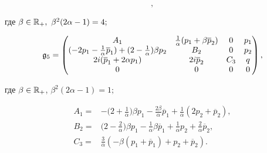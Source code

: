 \begin{thm}
\begin{equation}
,


\end{equation}


где $ \beta \in \Bbb R_+, \ \beta^2 (2 \alpha - 1 ) = 4;$


\begin{equation}


\frak g_5 =


\begin{pmatrix}


A_1 & \frac1{\alpha} ( p_1 + \beta \overline p_2 ) & 0 & p_1 


\\


( - 2 p_1 - \frac1{\alpha} \overline p_1 ) + ( 2 - \frac1{\alpha} ) \beta p_2 


& B_2 & 0 & p_2\\ 


2i (\overline p_1 + 2 \alpha p_1) & 2 i \overline p_2 & C_3 & q \\


0&0&0&0 


\end{pmatrix}


,


\end{equation}


где $\beta \in \Bbb R_+$, $\beta^2 ( 2 \alpha - 1) = 1;$ 


\begin{align*}


A_1 = & 


 - \bigg( 2 + \frac1{\alpha} \bigg) \beta p_1 


 -\frac {2\beta} { \alpha} \overline p_1 + 


\frac1{\alpha}( 2 p_2 + \overline p_2 ),


\\


B_2 =&


\bigg( 2 - \frac2{\alpha} \bigg)


\beta p_1 - \frac1{\alpha} \beta \overline p_1 + 


 \frac1{\alpha} p_2 + \frac2{\alpha} \overline p_2,\\


C_3 =&


\frac 3{ \alpha} ( - \beta ( p_1 + \overline p_1 ) + 


 p_2 + \overline p_2 ).


\end{align*}


\end{thm}





